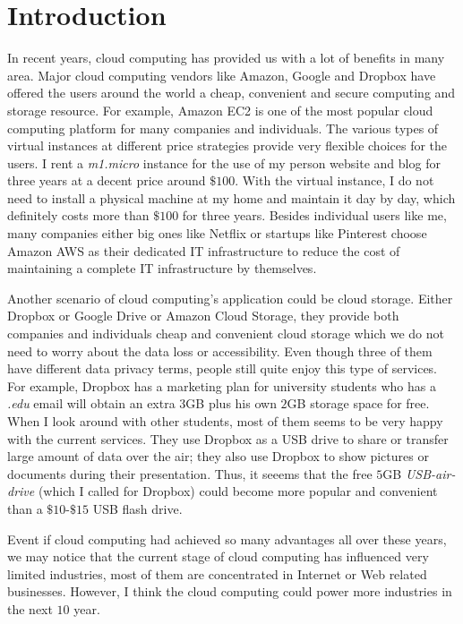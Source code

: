 \section{Introduction}
In recent years, cloud computing has provided us with a lot of benefits in many area. Major cloud computing vendors like Amazon, Google and Dropbox have offered the users around the world a cheap, convenient and secure computing and storage resource. For example, Amazon EC2\cite{garfinkel2007evaluation} is one of the most popular cloud computing platform for many companies and individuals. The various types of virtual instances at different price strategies provide very flexible choices for the users. I rent a \emph{m1.micro} instance for the use of my person website and blog for three years at a decent price around $\$100$. With the virtual instance, I do not need to install a physical machine at my home and maintain it day by day, which definitely costs more than $\$100$ for three years. Besides individual users like me, many companies either big ones like Netflix or startups like Pinterest choose Amazon AWS as their dedicated IT infrastructure to reduce the cost of maintaining a complete IT infrastructure by themselves. 

Another scenario of cloud computing's application could be cloud storage. Either Dropbox or Google Drive or Amazon Cloud Storage, they provide both companies and individuals cheap and convenient cloud storage which we do not need to worry about the data loss or accessibility. Even though three of them have different data privacy terms, people still quite enjoy this type of services. For example, Dropbox has a marketing plan for university students who has a \emph{.edu} email will obtain an extra $3$GB plus his own $2$GB storage space for free. When I look around with other students, most of them seems to be very happy with the current services. They use Dropbox as a USB drive to share or transfer large amount of data over the air; they also use Dropbox to show pictures or documents during their presentation. Thus, it seeems that the free $5$GB \emph{USB-air-drive} (which I called for Dropbox) could become more popular and convenient than a $\$10$-$\$15$ USB flash drive.

Event if cloud computing had achieved so many advantages all over these years, we may notice that the current stage of cloud computing has influenced very limited industries, most of them are concentrated in Internet or Web related businesses. However, I think the cloud computing could power more industries in the next $10$ year.   

